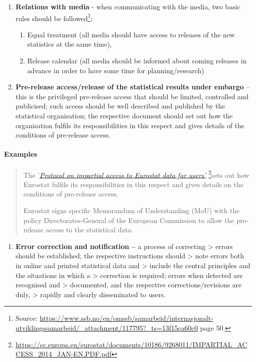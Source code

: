 \documentclass[
]{article}
\providecommand{\tightlist}{%
  \setlength{\itemsep}{0pt}\setlength{\parskip}{0pt}}
\begin{document}
\begin{enumerate}
\def\labelenumi{\arabic{enumi}.}
\setcounter{enumi}{21}
\item
  \textbf{Relations with media} - when communicating with the media, two
  basic rules should be followed\footnote{Source:
    \url{https://www.ssb.no/en/omssb/samarbeid/internasjonalt-utviklingssamarbeid/_attachment/117795?_ts=13f15ca60c0}
    page 50.}:

  \begin{enumerate}
  \def\labelenumii{\alph{enumii}.}
  \item
    Equal treatment (all media should have access to releases of the
    new statistics at the same time),
  \item
    Release calendar (all media should be informed about coming
    releases in advance in order to have some time for
    planning/research)
  \end{enumerate}
\item
  \textbf{Pre-release access/release of the statistical results under
  embargo} -- this is the privileged pre-release access that should
  be limited, controlled and publicised; such access should be well
  described and published by the statistical organisation; the
  respective document should set out how the organisation fulfils its
  responsibilities in this respect and gives details of the conditions
  of pre-release access.
\end{enumerate}

\hypertarget{examples-1}{%
\paragraph{Examples}\label{examples-1}}

\begin{quote}
The '\href{https://ec.europa.eu/eurostat/documents/10186/9268011/IMPARTIAL_ACCESS_2014_JAN-EN.PDF.pdf}{\emph{Protocol on impartial access to Eurostat data for
users'}}
\footnote{\url{https://ec.europa.eu/eurostat/documents/10186/9268011/IMPARTIAL_ACCESS_2014_JAN-EN.PDF.pdf}}sets out how Eurostat fulfils its responsibilities in this
respect and gives details on the conditions of pre-release access.

Eurostat signs specific Memorandum of Understanding (MoU) with the
policy Directorates-General of the European Commission to allow the
pre-release access to the statistical data.
\end{quote}

\begin{enumerate}
\def\labelenumi{\arabic{enumi}.}
\setcounter{enumi}{23}
\tightlist
\item
  \textbf{Error correction and notification --} a process of correcting
  \textgreater{} errors should be established; the respective instructions should
  \textgreater{} note errors both in online and printed statistical data and
  \textgreater{} include the central principles and the situations in which a
  \textgreater{} correction is required; errors when detected are recognised and
  \textgreater{} documented, and the respective corrections/revisions are duly,
  \textgreater{} rapidly and clearly disseminated to users.
\end{enumerate}
\end{document}

